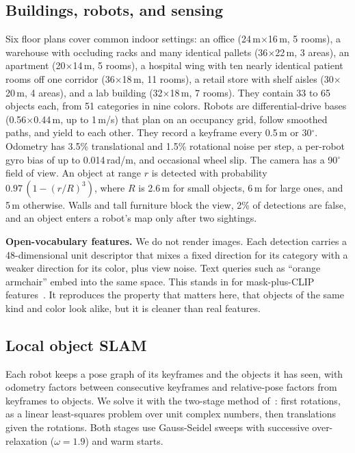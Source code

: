 \documentclass[conference]{IEEEtran}
\begin{document}
\subsection{Buildings, robots, and sensing}
Six floor plans cover common indoor settings: an office (24\,m$\times$16\,m, 5 rooms), a warehouse with occluding racks and many identical pallets (36$\times$22\,m, 3 areas), an apartment (20$\times$14\,m, 5 rooms), a hospital wing with ten nearly identical patient rooms off one corridor (36$\times$18\,m, 11 rooms), a retail store with shelf aisles (30$\times$20\,m, 4 areas), and a lab building (32$\times$18\,m, 7 rooms).
They contain 33 to 65 objects each, from 51 categories in nine colors.
Robots are differential-drive bases (0.56$\times$0.44\,m, up to 1\,m/s) that plan on an occupancy grid, follow smoothed paths, and yield to each other.
They record a keyframe every 0.5\,m or 30$^\circ$.
Odometry has 3.5\% translational and 1.5\% rotational noise per step, a per-robot gyro bias of up to 0.014\,rad/m, and occasional wheel slip.
The camera has a 90$^\circ$ field of view.
An object at range $r$ is detected with probability $0.97\,(1-(r/R)^3)$, where $R$ is 2.6\,m for small objects, 6\,m for large ones, and 5\,m otherwise.
Walls and tall furniture block the view, 2\% of detections are false, and an object enters a robot's map only after two sightings.

\textbf{Open-vocabulary features.}
We do not render images.
Each detection carries a 48-dimensional unit descriptor that mixes a fixed direction for its category with a weaker direction for its color, plus view noise.
Text queries such as ``orange armchair'' embed into the same space.
This stands in for mask-plus-CLIP features~\cite{ravi2025sam2,radford2021clip}.
It reproduces the property that matters here, that objects of the same kind and color look alike, but it is cleaner than real features.

\subsection{Local object SLAM}
Each robot keeps a pose graph of its keyframes and the objects it has seen, with odometry factors between consecutive keyframes and relative-pose factors from keyframes to objects.
We solve it with the two-stage method of~\cite{choudhary2016icra}: first rotations, as a linear least-squares problem over unit complex numbers, then translations given the rotations.
Both stages use Gauss-Seidel sweeps with successive over-relaxation ($\omega=1.9$) and warm starts.
\end{document}
